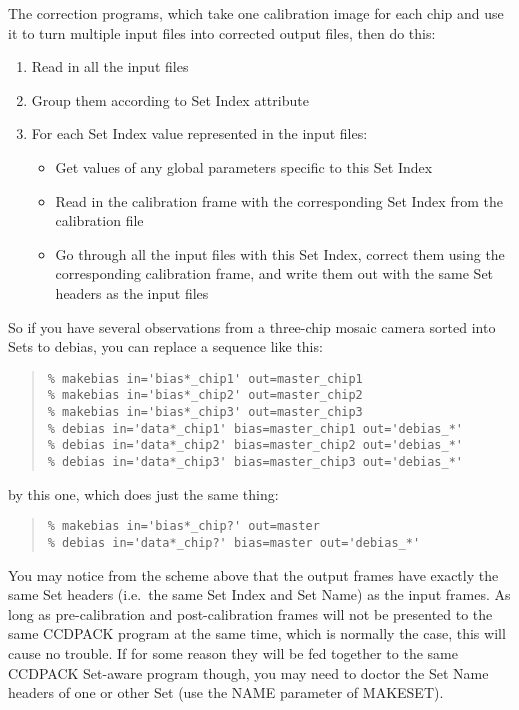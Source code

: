 \documentclass[twoside,11pt]{article}
\newcommand{\htmlref}[2]{#1}
\newcommand{\latexhtml}[2]{#1}
\renewcommand{\_}{\texttt{\symbol{95}}}
\newcommand{\ttsize}{\latexhtml{\small}{}}
\newenvironment{myquote}{\begin{quote}\ttsize}{\end{quote}}
\newcommand{\xroutine}[1]{\htmlref{{\sc #1}}{#1}}
\begin{document}
The correction programs, 
which take one calibration image for each chip and use it to turn multiple
input files into corrected output files,
then do this:
\begin{enumerate}
\item
Read in all the input files
\item
Group them according to Set Index attribute
\item
For each Set Index value represented in the input files:
\begin{itemize}
\item Get values of any global parameters specific to this Set Index
\item Read in the calibration frame with the corresponding Set Index
      from the calibration file
\item Go through all the input files with this Set Index, correct them
      using the corresponding calibration frame, and write them out with
      the same Set headers as the input files
\end{itemize}
\end{enumerate}

So if you have several observations from a three-chip mosaic camera 
sorted into Sets to debias, you can replace a sequence like this:
\begin{myquote}
\begin{verbatim}
% makebias in='bias*_chip1' out=master_chip1
% makebias in='bias*_chip2' out=master_chip2
% makebias in='bias*_chip3' out=master_chip3
% debias in='data*_chip1' bias=master_chip1 out='debias_*'
% debias in='data*_chip2' bias=master_chip2 out='debias_*'
% debias in='data*_chip3' bias=master_chip3 out='debias_*'
\end{verbatim}
\end{myquote}
by this one, which does just the same thing:
\begin{myquote}
\begin{verbatim}
% makebias in='bias*_chip?' out=master 
% debias in='data*_chip?' bias=master out='debias_*'
\end{verbatim}
\end{myquote}

You may notice from the scheme above that 
the output frames have exactly the same Set headers 
(i.e.\ the same Set Index and Set Name) as the input frames.
As long as pre-calibration and post-calibration frames will not
be presented to the same CCDPACK program at the same time,
which is normally the case, this will cause no trouble.
If for some reason they will be fed together to the same 
CCDPACK Set-aware program though, you may need to doctor the Set Name
headers of one or other Set (use the NAME parameter of \xroutine{MAKESET}).
\end{document}
